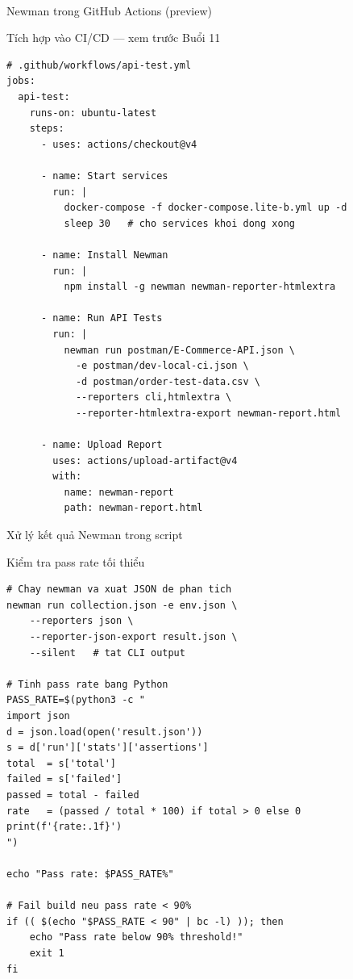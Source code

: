 \documentclass[aspectratio=169,10pt]{beamer}
\newcommand{\sref}[1]{\textsuperscript{\scriptsize\cite{#1}}}
\begin{document}
\begin{frame}[fragile]{Newman trong GitHub Actions (preview)\sref{github-actions}}
  \begin{block}{Tích hợp vào CI/CD --- xem trước Buổi 11}
\begin{lstlisting}[language={}]
# .github/workflows/api-test.yml
jobs:
  api-test:
    runs-on: ubuntu-latest
    steps:
      - uses: actions/checkout@v4

      - name: Start services
        run: |
          docker-compose -f docker-compose.lite-b.yml up -d
          sleep 30   # cho services khoi dong xong

      - name: Install Newman
        run: |
          npm install -g newman newman-reporter-htmlextra

      - name: Run API Tests
        run: |
          newman run postman/E-Commerce-API.json \
            -e postman/dev-local-ci.json \
            -d postman/order-test-data.csv \
            --reporters cli,htmlextra \
            --reporter-htmlextra-export newman-report.html

      - name: Upload Report
        uses: actions/upload-artifact@v4
        with:
          name: newman-report
          path: newman-report.html
\end{lstlisting}
  \end{block}
\end{frame}

\begin{frame}[fragile]{Xử lý kết quả Newman trong script}
  \begin{block}{Kiểm tra pass rate tối thiểu}
\begin{lstlisting}[style=bash]
# Chay newman va xuat JSON de phan tich
newman run collection.json -e env.json \
    --reporters json \
    --reporter-json-export result.json \
    --silent   # tat CLI output

# Tinh pass rate bang Python
PASS_RATE=$(python3 -c "
import json
d = json.load(open('result.json'))
s = d['run']['stats']['assertions']
total  = s['total']
failed = s['failed']
passed = total - failed
rate   = (passed / total * 100) if total > 0 else 0
print(f'{rate:.1f}')
")

echo "Pass rate: $PASS_RATE%"

# Fail build neu pass rate < 90%
if (( $(echo "$PASS_RATE < 90" | bc -l) )); then
    echo "Pass rate below 90% threshold!"
    exit 1
fi
\end{lstlisting}
  \end{block}
\end{frame}
\end{document}
